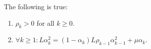 \documentclass[12pt]{article}
\begin{document}
    \begin{observation}\label{obs:r-wapg-observation-1}
        The following is true: 
        \begin{enumerate}
            \item $\rho_k > 0$ for all $k \ge 0$. 
            \item $\forall k \ge 1: L\alpha_k^2 = (1 - \alpha_k)L\rho_{k - 1}\alpha_{k - 1}^2 +\mu\alpha_k$. 
        \end{enumerate}
        

\end{observation}
\end{document}
